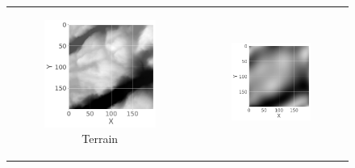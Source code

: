 \begin{figure}[t]
    \centering
    \begin{tabular}{cc}
        \begin{subfigure}[b]{0.37\textwidth}
            \centering
            \includegraphics[width=\textwidth]{latex/figures/terrain1.pdf}
            \caption{Terrain}
            \label{fig:terrain1}
        \end{subfigure} &
        \begin{subfigure}[b]{0.37\textwidth}
            \centering
            \includegraphics[width=\textwidth]{latex/figures/ridge_terrain1_prediction.pdf}

\end{subfigure}
\end{tabular}
\end{figure}
